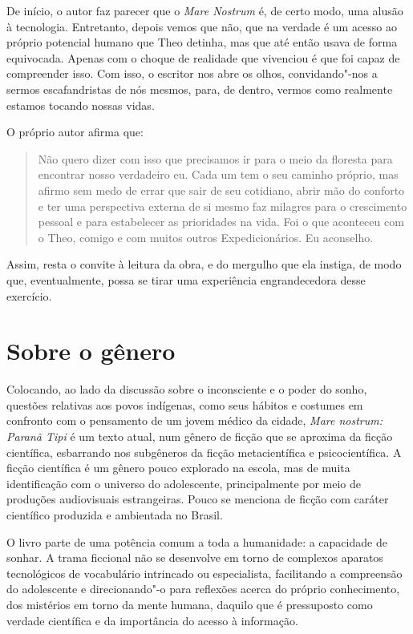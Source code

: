 De início, o autor faz parecer que o \textit{Mare Nostrum} é, de certo modo, uma
alusão à tecnologia. Entretanto, depois vemos que não, que na verdade é
um acesso ao próprio potencial humano que Theo detinha, mas que até
então usava de forma equivocada. Apenas com o choque de realidade que
vivenciou é que foi capaz de compreender isso. Com isso, o escritor nos
abre os olhos, convidando"-nos a sermos escafandristas de nós mesmos,
para, de dentro, vermos como realmente estamos tocando nossas vidas.

O próprio autor afirma que:

\begin{quote}
Não quero dizer com isso que precisamos ir para o meio da floresta para
encontrar nosso verdadeiro eu. Cada um tem o seu caminho próprio, mas
afirmo sem medo de errar que sair de seu cotidiano, abrir mão do
conforto e ter uma perspectiva externa de si mesmo faz milagres para o
crescimento pessoal e para estabelecer as prioridades na vida. Foi o que
aconteceu com o Theo, comigo e com muitos outros Expedicionários. Eu
aconselho.
\end{quote}

Assim, resta o convite à leitura da obra, e do mergulho que ela instiga,
de modo que, eventualmente, possa se tirar uma experiência
engrandecedora desse exercício.


\section{Sobre o gênero}

Colocando, ao lado da discussão sobre o inconsciente e o poder do sonho, questões relativas aos povos indígenas, como seus hábitos e costumes em confronto com o pensamento de um jovem médico da cidade, \emph{Mare nostrum: Paranã Tipi} é um texto atual, num gênero de ficção que se aproxima da ficção científica, esbarrando nos subgêneros da ficção metacientífica e psicocientífica. A ficção científica é um gênero pouco explorado na escola, mas de muita identificação com o universo do adolescente, principalmente por meio de produções audiovisuais estrangeiras. Pouco se menciona de ficção com caráter científico produzida e ambientada no Brasil.

O livro parte de uma potência comum a toda a humanidade: a capacidade de sonhar. A trama ficcional não se desenvolve em torno de complexos aparatos tecnológicos de vocabulário intrincado ou especialista, facilitando a compreensão do adolescente e direcionando"-o para reflexões acerca do próprio conhecimento, dos mistérios em torno da mente humana, daquilo que é pressuposto como verdade científica e da importância do acesso à informação. 

